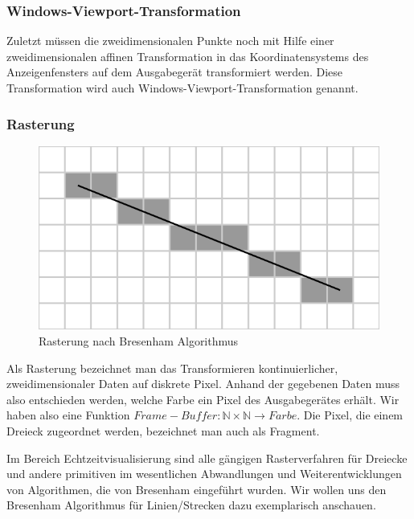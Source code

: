 \subsubsection*{Windows-Viewport-Transformation}
Zuletzt müssen die zweidimensionalen Punkte noch mit Hilfe einer 
zweidimensionalen affinen Transformation in das Koordinatensystems des 
Anzeigenfensters auf dem Ausgabegerät transformiert werden. 
Diese Transformation wird auch Windows-Viewport-Transformation genannt.

\subsubsection{Rasterung}
\begin{figure}[H]
    \centering
    \includegraphics[width=1.0\textwidth]{images/bresenham.png}
    \caption{Rasterung nach Bresenham Algorithmus}
    \label{fig:screening-bresenham-line}
\end{figure}
Als Rasterung bezeichnet man das Transformieren kontinuierlicher, 
zweidimensionaler Daten auf diskrete Pixel.  
Anhand der gegebenen Daten muss also entschieden werden, welche Farbe ein Pixel des Ausgabegerätes erhält.
Wir haben also eine Funktion 
$Frame-Buffer: \mathbb{N} \times \mathbb{N} \to Farbe$. 
Die Pixel, die einem Dreieck zugeordnet werden, bezeichnet man auch als Fragment.

Im Bereich Echtzeitvisualisierung sind alle gängigen Rasterverfahren für 
Dreiecke und andere primitiven im wesentlichen Abwandlungen und 
Weiterentwicklungen von Algorithmen, die von Bresenham eingeführt wurden. 
Wir wollen uns den Bresenham Algorithmus für Linien/Strecken dazu exemplarisch 
anschauen.

